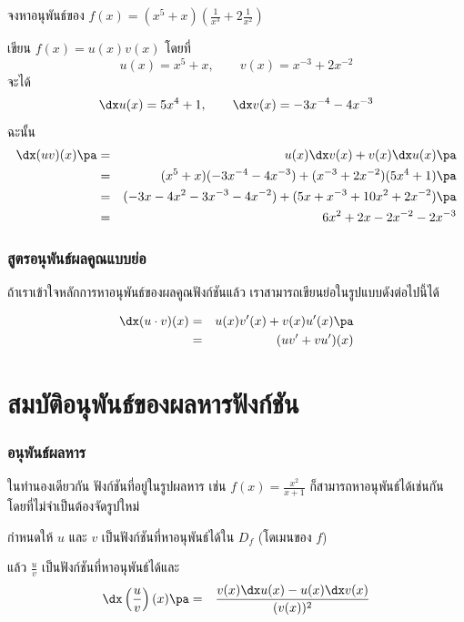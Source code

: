 \begin{frame}[t]
\begin{ex}
จงหาอนุพันธ์ของ $f(x) =(x^5+x)\left(\frac{1}{x^3} + 2\frac{1}{x^2}\right)$
\end{ex} \pa
\begin{sol}
เขียน $f(x) = u(x) v(x)$ โดยที่ 
\[u(x) = x^5+x, \qquad v(x) = x^{-3} + 2x^{-2}\] 
\pa จะได้ 
\[\dx u(x) = 5x^4+1, \qquad \dx v(x) = -3x^{-4} - 4x^{-3}\] 
\pa ฉะนั้น
\begin{eqnarray*}
\dx (uv)(x) \pa &=& u(x)\dx v(x) + v(x)\dx u(x) \pa \\
&=& (x^5+x)(-3x^{-4} - 4x^{-3}) +  (x^{-3} + 2x^{-2})(5x^4+1)\pa \\
&=& (-3x-4x^2-3x^{-3}-4x^{-2})+(5x+x^{-3}+10x^2+2x^{-2}) \pa \\
&=& 6x^2+2x-2x^{-2}-2x^{-3}
\end{eqnarray*}
\end{sol}
\end{frame}

\begin{frame}
\frametitle{สูตรอนุพันธ์ผลคูณแบบย่อ}
ถ้าเราเข้าใจหลักการหาอนุพันธ์ของผลคูณฟังก์ชันแล้ว เราสามารถเขียนย่อในรูปแบบดังต่อไปนี้ได้
\begin{remark}{}
\begin{eqnarray*}
\dx (u\cdot v)(x) &=& u(x)v'(x) + v(x)u'(x) \pa \\
&=& (uv' + vu')(x) 
\end{eqnarray*}
\end{remark}
\end{frame}

\section[หาร]{สมบัติอนุพันธ์ของผลหารฟังก์ชัน}
\frame{\sectionpage}

\begin{frame}
\frametitle{อนุพันธ์ผลหาร}
ในทำนองเดียวกัน ฟังก์ชันที่อยู่ในรูปผลหาร เช่น $f(x) = \frac{x^2}{x+1}$
ก็สามารถหาอนุพันธ์ได้เช่นกัน โดยที่ไม่จำเป็นต้องจัดรูปใหม่
\begin{thm}{}{}
กำหนดให้ $u$ และ $v$ เป็นฟังก์ชันที่หาอนุพันธ์ได้ใน $D_f$ (โดเมนของ $f$)  \pa

แล้ว $\frac{u}{v}$ เป็นฟังก์ชันที่หาอนุพันธ์ได้และ \pa
\begin{eqnarray}
\dx \left(\frac{u}{v} \right)(x) \pa &=& \frac{v(x) \dx u(x) - u(x) \dx v(x)}{(v(x))^2}
\end{eqnarray}
\end{thm}
\end{frame}


